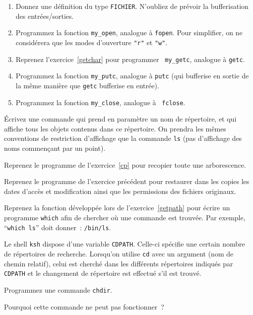 \begin {enumerate}
    \item Donnez une définition du type {\tt FICHIER}.  N'oubliez de
	prévoir la bufferisation des entrées/sorties.

    \item Programmez la fonction {\tt my\_open}, analogue à {\tt fopen}.
	Pour simplifier, on ne considérera que les modes d'ouverture
	\verb|"r"| et \verb|"w"|.

    \item Reprenez l'exercice~\ref {getchar} pour programmer {\tt
	my\_getc}, analogue à {\tt getc}.

    \item Programmez la fonction {\tt my\_putc}, analogue à {\tt putc}
	(qui bufferise en sortie de la même manière que \texttt {getc}
	bufferise en entrée).

    \item Programmez la fonction {\tt my\_close}, analogue à {\tt
	fclose}.

\end {enumerate}



\question

Écrivez une commande qui prend en paramètre un nom de répertoire, et
qui affiche tous les objets contenus dans ce répertoire. On prendra les
mêmes conventions de restriction d'affichage que la commande {\tt ls}
(pas d'affichage des noms commençant par un point).


\question

Reprenez le programme de l'exercice~\ref {cp} pour recopier toute une
arborescence.


\question

Reprenez le programme de l'exercice précédent pour restaurer dans les
copies les dates d'accès et modification ainsi que les permissions des
fichiers originaux.


\question

Reprenez la fonction développée lors de l'exercice~\ref {getpath} pour écrire
un programme {\tt which} afin de chercher où une commande est trouvée.
Par exemple, ``{\tt which~ls}'' doit donner~: {\tt /bin/ls}.


\question

Le shell {\tt ksh} dispose d'une variable {\tt CDPATH}.  Celle-ci
spécifie une certain nombre de répertoires de recherche.  Lorsqu'on
utilise {\tt cd} avec un argument (nom de chemin relatif), celui est
cherché dans les différents répertoires indiqués par {\tt CDPATH} et le
changement de répertoire est effectué s'il est trouvé.

Programmez une commande {\tt chdir}.

Pourquoi cette commande ne peut pas fonctionner~?


